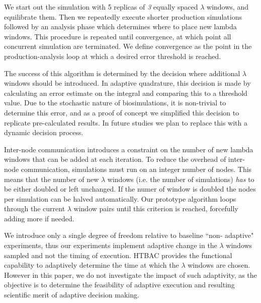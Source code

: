We start out the simulation with 5 replicas of \emph{3} equally spaced
$\lambda$ windows, and equilibrate them.
Then we repeatedly execute
shorter production simulations followed by an analysis phase which determines 
where to place new lambda windows.
This procedure is repeated until convergence, at which point all
concurrent simulation are terminated.
We define convergence as the point in
the production-analysis loop at which a desired error threshold is
reached.

The success of this algorithm is determined by the decision
where additional $\lambda$ windows should be introduced.
In adaptive quadrature, this decision is made by
calculating an error estimate on the integral and comparing this to a threshold 
value. Due to the stochastic nature of biosimulations, it is
non-trivial to determine this error, and as a proof of concept we simplified
this decision to replicate pre-calculated results. In future studies we plan
to replace this with a dynamic decision process.

Inter-node communication introduces a constraint on the number of new lambda 
windows that can be added at each iteration. To reduce the overhead of 
inter-node communication, simulations must run on an integer number of nodes. 
This means that the number of new $\lambda$ windows (i.e. the number of 
simulations) \emph{has} to be either doubled or left unchanged.
If the numer of window is doubled the nodes per simulation can be halved 
automatically. Our prototype algorithm loops through the current $\lambda$ 
window pairs until this criterion is reached, forcefully adding more if needed.




We introduce only a single degree of freedom relative to baseline ``non-
adaptive" experiments, thus our experiments implement adaptive change in the
$\lambda$ windows sampled and not the timing of execution. HTBAC provides the 
functional capability to adaptively determine the time at which the $\lambda$ 
windows are chosen. However in this paper, we do not investigate the impact of 
such adaptivity, as the objective is to determine the feasibility of adaptive
execution and resulting scientific merit of adaptive decision making.

